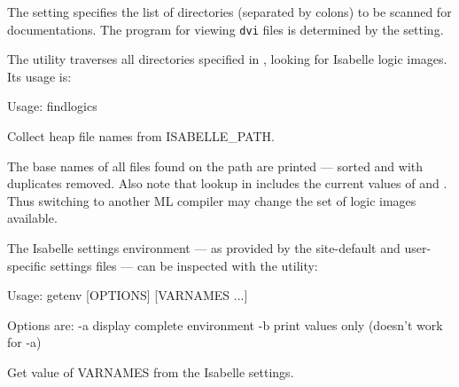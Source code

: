 \begin{isabellebody}
\begin{isamarkuptext}
  \medskip The \hyperlink{setting.ISABELLE-DOCS}{\mbox{}} setting specifies the list of
  directories (separated by colons) to be scanned for documentations.
  The program for viewing \verb|dvi| files is determined by the
  \hyperlink{setting.DVI-VIEWER}{\mbox{}} setting.%
\end{isamarkuptext}%
\isamarkuptrue%
%
\isamarkuptrue%
%
\begin{isamarkuptext}%
The \hypertarget{tool.findlogics}{\hyperlink{tool.findlogics}{\mbox{}}} utility traverses all directories
  specified in \hyperlink{setting.ISABELLE-PATH}{\mbox{}}, looking for Isabelle logic
  images. Its usage is:
\begin{ttbox}
Usage: findlogics

  Collect heap file names from ISABELLE_PATH.
\end{ttbox}

  The base names of all files found on the path are printed --- sorted
  and with duplicates removed. Also note that lookup in \hyperlink{setting.ISABELLE-PATH}{\mbox{}} includes the current values of \hyperlink{setting.ML-SYSTEM}{\mbox{}}
  and \hyperlink{setting.ML-PLATFORM}{\mbox{}}. Thus switching to another ML compiler
  may change the set of logic images available.%
\end{isamarkuptext}%
\isamarkuptrue%
%
\isamarkuptrue%
%
\begin{isamarkuptext}%
The Isabelle settings environment --- as provided by the
  site-default and user-specific settings files --- can be inspected
  with the \hypertarget{tool.getenv}{\hyperlink{tool.getenv}{\mbox{}}} utility:
\begin{ttbox}
Usage: getenv [OPTIONS] [VARNAMES ...]

  Options are:
    -a           display complete environment
    -b           print values only (doesn't work for -a)

  Get value of VARNAMES from the Isabelle settings.
\end{ttbox}


\end{isamarkuptext}
\end{isabellebody}

